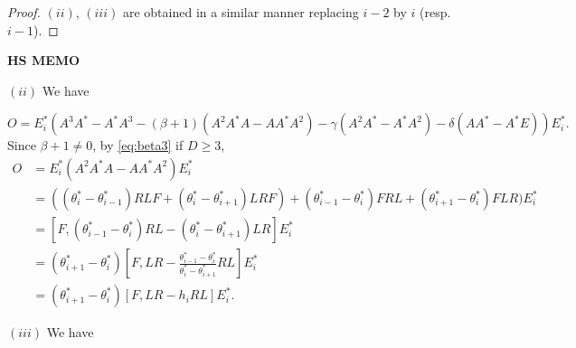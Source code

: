 \documentclass[
]{book}
\theoremstyle{definition}
\theoremstyle{definition}
\theoremstyle{definition}
\theoremstyle{definition}
\theoremstyle{remark}
\begin{document}
\begin{proof}
\((ii)\), \((iii)\) are obtained in a similar manner replacing \(i-2\) by \(i\) (resp. \(i-1\)).

\end{proof}

\hfill\break

\textbf{HS MEMO}

\((ii)\) We have

\[O = E^*_i(A^3A^*-A^*A^3-(\beta+1)(A^2A^*A-AA^*A^2)-\gamma(A^2A^*-A^*A^2)-\delta(AA^*-A^*E))E^*_i.\]
Since \(\beta+1\neq 0\), by \eqref{eq:beta3} if \(D\geq 3\),
\begin{align}
O &= E^*_i(A^2A^*A - AA^*A^2)E^*_i\\
& = ((\theta^*_i-\theta^*_{i-1})RLF + (\theta^*_i-\theta^*_{i+1})LRF)+(\theta^*_{i-1}-\theta^*_i)FRL+(\theta^*_{i+1}-\theta^*_i)FLR)E^*_i\\
& = [F, (\theta^*_{i-1}-\theta^*_i)RL - (\theta^*_i-\theta^*_{i+1})LR]E^*_i\\
& = (\theta^*_{i+1}-\theta^*_i)\left[F, LR - \frac{\theta^*_{i-1}-\theta^*_i}{\theta^*_i-\theta^*_{i+1}}RL\right]E^*_i\\
& = (\theta^*_{i+1}-\theta^*_i)[F, LR - h_i RL]E^*_i.
\end{align}

\((iii)\) We have
\end{document}
